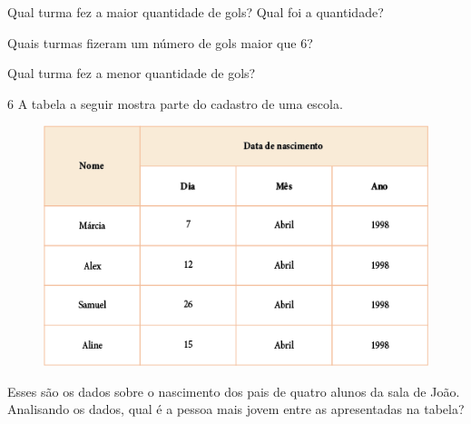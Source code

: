 \begin{escolha}
\item Qual turma fez a maior quantidade de gols? Qual foi a quantidade?\\

\item Quais turmas fizeram um número de gols maior que 6?\\

\item  Qual turma fez a menor quantidade de gols?\\
\end{escolha}

\pagebreak
\num{6} A tabela a seguir mostra parte do cadastro de uma escola.

\begin{figure}[htpb!]
\centering
\includegraphics[width=.8\textwidth]{media/image45.png}
\end{figure}

Esses são os dados sobre o nascimento dos pais de quatro alunos da sala
de João. Analisando os dados, qual é a pessoa mais jovem
entre as apresentadas na tabela? 

